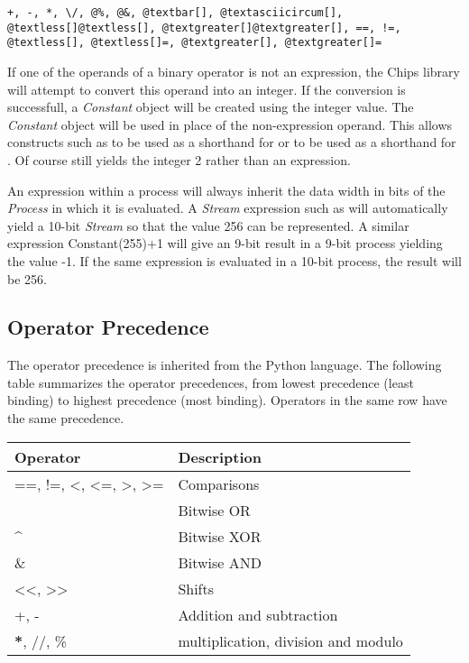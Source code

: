 \documentclass[letterpaper,10pt,english]{manual}
\begin{document}
\begin{Verbatim}[commandchars=@\[\]]
+, -, *, \/, @%, @&, @textbar[], @textasciicircum[], @textless[]@textless[], @textgreater[]@textgreater[], ==, !=, @textless[], @textless[]=, @textgreater[], @textgreater[]=
\end{Verbatim}

If one of the operands of a binary operator is not an expression, the Chips
library will attempt to convert this operand into an integer. If the conversion
is successfull, a \emph{Constant} object will be created using the integer value.
The \emph{Constant} object will be used in place of the non-expression operand. This
allows constructs such as  to be used as a shorthand for
 or  to be used
as a shorthand for .  Of course 
still yields the integer 2 rather than an expression.

An expression within a process will always inherit the data width in bits of
the \emph{Process} in which it is evaluated. A \emph{Stream} expression such as
 will automatically yield a 10-bit \emph{Stream} so that the
value 256 can be represented. A similar expression Constant(255)+1 will give an
9-bit result in a 9-bit process yielding the value -1. If the same expression
is evaluated in a 10-bit process, the result will be 256.


\subsection{Operator Precedence}

The operator precedence is inherited from the Python language. The following
table summarizes the operator precedences, from lowest precedence (least
binding) to highest precedence (most binding). Operators in the same row have
the same precedence.

\begin{tabulary}{\textwidth}{|L|L|}
\hline
\textbf{
Operator
} & \textbf{
Description
}\\
\hline

==, !=, \textless{}, \textless{}=, \textgreater{}, \textgreater{}=
 & 
Comparisons
\\
{\raggedright{}~}
 & 
Bitwise OR
\\

\textasciicircum{}
 & 
Bitwise XOR
\\

\&
 & 
Bitwise AND
\\

\textless{}\textless{}, \textgreater{}\textgreater{}
 & 
Shifts
\\

+, -
 & 
Addition and subtraction
\\

{\color{red}\bfseries{}*}, //, \%
 & 
multiplication, division and modulo
\\
\hline
\end{tabulary}
\end{document}

